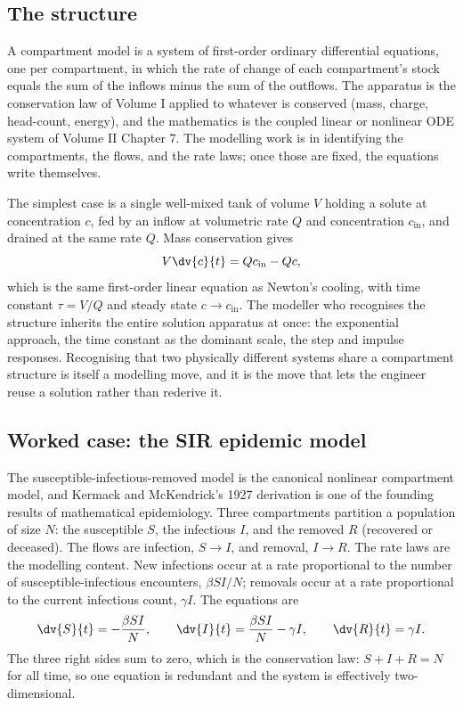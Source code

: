 \subsection{The structure}

A compartment model is a system of first-order ordinary differential
equations, one per compartment, in which the rate of change of each
compartment's stock equals the sum of the inflows minus the sum of the
outflows. The apparatus is the conservation law of Volume I applied to
whatever is conserved (mass, charge, head-count, energy), and the
mathematics is the coupled linear or nonlinear ODE system of Volume II
Chapter 7. The modelling work is in identifying the compartments, the
flows, and the rate laws; once those are fixed, the equations write
themselves.

The simplest case is a single well-mixed tank of volume $V$ holding a
solute at concentration $c$, fed by an inflow at volumetric rate $Q$
and concentration $c_{\text{in}}$, and drained at the same rate $Q$.
Mass conservation gives
\[
V \dv{c}{t} = Q c_{\text{in}} - Q c,
\]
which is the same first-order linear equation as Newton's cooling, with
time constant $\tau = V/Q$ and steady state $c \to c_{\text{in}}$. The
modeller who recognises the structure inherits the entire solution
apparatus at once: the exponential approach, the time constant as the
dominant scale, the step and impulse responses. Recognising that two
physically different systems share a compartment structure is itself a
modelling move, and it is the move that lets the engineer reuse a
solution rather than rederive it.

\subsection{Worked case: the SIR epidemic model}

The susceptible-infectious-removed model is the canonical nonlinear
compartment model, and Kermack and McKendrick's 1927 derivation
\cite{paper:v6c08-kermack-mckendrick-1927} is one of the founding
results of mathematical epidemiology. Three compartments partition a
population of size $N$: the susceptible $S$, the infectious $I$, and the
removed $R$ (recovered or deceased). The flows are infection, $S \to I$,
and removal, $I \to R$. The rate laws are the modelling content. New
infections occur at a rate proportional to the number of
susceptible-infectious encounters, $\beta S I / N$; removals occur at a
rate proportional to the current infectious count, $\gamma I$. The
equations are
\[
\dv{S}{t} = -\frac{\beta S I}{N},
\qquad
\dv{I}{t} = \frac{\beta S I}{N} - \gamma I,
\qquad
\dv{R}{t} = \gamma I.
\]
The three right sides sum to zero, which is the conservation law:
$S + I + R = N$ for all time, so one equation is redundant and the
system is effectively two-dimensional.

